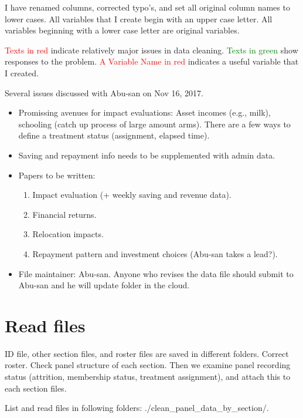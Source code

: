 I have renamed columns, corrected typo's, and set all original column names to lower cases. All variables that I create begin with an upper case letter. All variables beginning with a lower case letter are original variables.

\textcolor{red}{Texts in red} indicate relatively major issues in data cleaning. \textcolor{green}{Texts in green} show responses to the problem. \textcolor{red}{A Variable Name in red} indicates a useful variable that I created.

Several issues discussed with Abu-san on Nov 16, 2017.
\begin{itemize}
\vspace{1.0ex}\setlength{\itemsep}{1.0ex}\setlength{\baselineskip}{12pt}
\item	Promissing avenues for impact evaluations: Asset incomes (e.g., milk), schooling (catch up process of large amount arms). There are a few ways to define a treatment status (assignment, elapsed time).
\item	Saving and repayment info needs to be supplemented with admin data.
\item	Papers to be written:
	\begin{enumerate}
	\vspace{1.0ex}\setlength{\itemsep}{1.0ex}\setlength{\baselineskip}{12pt}
	\item	Impact evaluation (+ weekly saving and revenue data).
	\item	Financial returns.
	\item	Relocation impacts.
	\item	Repayment pattern and investment choices (Abu-san takes a lead?).
	\end{enumerate}
\item	File maintainer: Abu-san. Anyone who revises the data file should submit to Abu-san and he will update folder in the cloud.
\end{itemize}

\section{Read files}

	ID file, other section files, and roster files are saved in different folders. Correct roster. Check panel structure of each section. Then we examine panel recording status (attrition, membership status, treatment assignment), and attach this to each section files.

	List and read files in following folders: \textsf{\footnotesize ./clean\_panel\_data\_by\_section/}. 
	

